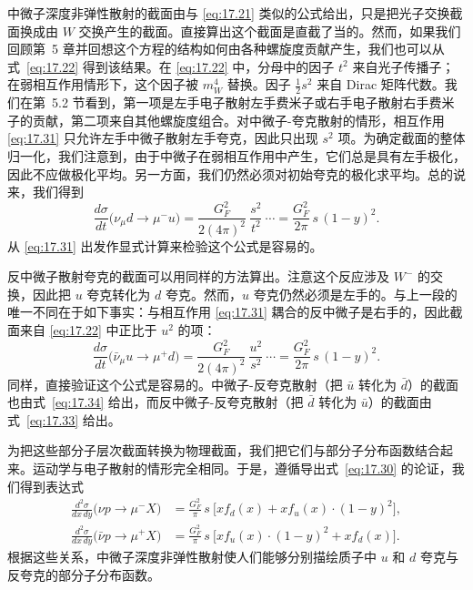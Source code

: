 中微子深度非弹性散射的截面由与 \eqref{eq:17.21} 类似的公式给出，只是把光子交换截面换成由 $W$ 交换产生的截面。直接算出这个截面是直截了当的。然而，如果我们回顾第~5 章并回想这个方程的结构如何由各种螺旋度贡献产生，我们也可以从式~\eqref{eq:17.22} 得到该结果。在 \eqref{eq:17.22} 中，分母中的因子 $t^2$ 来自光子传播子；在弱相互作用情形下，这个因子被 $m_W^4$ 替换。因子 $\tfrac{1}{2}s^2$ 来自 Dirac 矩阵代数。我们在第~5.2 节看到，第一项是左手电子散射左手费米子或右手电子散射右手费米子的贡献，第二项来自其他螺旋度组合。对中微子-夸克散射的情形，相互作用 \eqref{eq:17.31} 只允许左手中微子散射左手夸克，因此只出现 $s^2$ 项。为确定截面的整体归一化，我们注意到，由于中微子在弱相互作用中产生，它们总是具有左手极化，因此不应做极化平均。另一方面，我们仍然必须对初始夸克的极化求平均。总的说来，我们得到
\begin{equation}
  \frac{d\sigma}{dt}\bigl( \nu_\mu d \to \mu^{-}u \bigr)
  = \frac{G_F^2}{2(4\pi)^2}\ \frac{s^2}{t^2}\ \cdots
  = \frac{G_F^2}{2\pi}\,s\,(1-y)^2 .
  \label{eq:17.33}
\end{equation}
从 \eqref{eq:17.31} 出发作显式计算来检验这个公式是容易的。

反中微子散射夸克的截面可以用同样的方法算出。注意这个反应涉及 $W^{-}$ 的交换，因此把 $u$ 夸克转化为 $d$ 夸克。然而，$u$ 夸克仍然必须是左手的。与上一段的唯一不同在于如下事实：与相互作用 \eqref{eq:17.31} 耦合的反中微子是右手的，因此截面来自 \eqref{eq:17.22} 中正比于 $u^2$ 的项：
\begin{equation}
  \frac{d\sigma}{dt}\bigl( \bar{\nu}_\mu u \to \mu^{+}d \bigr)
  = \frac{G_F^2}{2(4\pi)^2}\ \frac{u^2}{s^2}\ \cdots
  = \frac{G_F^2}{2\pi}\,s\,(1-y)^2 .
  \label{eq:17.34}
\end{equation}
同样，直接验证这个公式是容易的。中微子-反夸克散射（把 $\bar{u}$ 转化为 $\bar{d}$）的截面也由式~\eqref{eq:17.34} 给出，而反中微子-反夸克散射（把 $\bar{d}$ 转化为 $\bar{u}$）的截面由式~\eqref{eq:17.33} 给出。

为把这些部分子层次截面转换为物理截面，我们把它们与部分子分布函数结合起来。运动学与电子散射的情形完全相同。于是，遵循导出式~\eqref{eq:17.30} 的论证，我们得到表达式
\begin{equation}
  \begin{aligned}
    \frac{d^2\sigma}{dx\,dy}\bigl( \nu p \to \mu^{-}X \bigr)
    &= \frac{G_F^2}{\pi}\,s\ \bigl[ xf_d(x) + xf_u(x)\cdot(1-y)^2 \bigr],\\
    \frac{d^2\sigma}{dx\,dy}\bigl( \bar{\nu} p \to \mu^{+}X \bigr)
    &= \frac{G_F^2}{\pi}\,s\ \bigl[ xf_u(x)\cdot(1-y)^2 + xf_d(x) \bigr].
  \end{aligned}
  \label{eq:17.35}
\end{equation}
根据这些关系，中微子深度非弹性散射使人们能够分别描绘质子中 $u$ 和 $d$ 夸克与反夸克的部分子分布函数。

